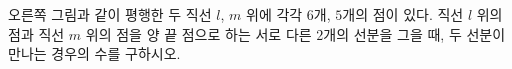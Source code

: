 \hspace*{2mm}\begin{minipage}[t]{\dimexpr\linewidth-2mm\relax}\vspace{0pt}
\noindent\begin{minipage}[t]{0.58\linewidth}\vspace{0pt}\raggedright 오른쪽 그림과 같이 평행한 두 직선 $l$, $m$ 위에 각각 $6$개, $5$개의 점이 있다. 직선 $l$ 위의 점과 직선 $m$ 위의 점을 양 끝 점으로 하는 서로 다른 $2$개의 선분을 그을 때, 두 선분이 만나는 경우의 수를 구하시오. \end{minipage}\hfill\begin{minipage}[t]{0.4\linewidth}\vspace{0pt}\centering \resizebox{\ifdim\width>\linewidth\linewidth\else\width\fi}{!}{}\end{minipage}\par\end{minipage}
